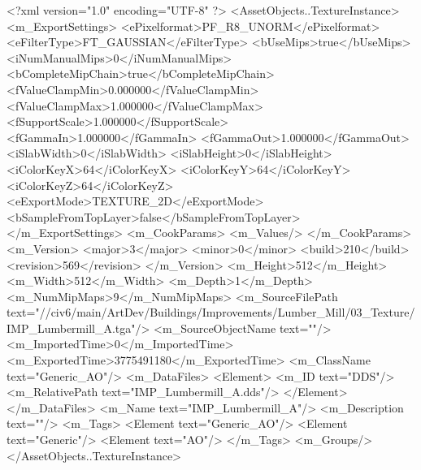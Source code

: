 <?xml version="1.0" encoding="UTF-8" ?>
<AssetObjects..TextureInstance>
	<m_ExportSettings>
		<ePixelformat>PF_R8_UNORM</ePixelformat>
		<eFilterType>FT_GAUSSIAN</eFilterType>
		<bUseMips>true</bUseMips>
		<iNumManualMips>0</iNumManualMips>
		<bCompleteMipChain>true</bCompleteMipChain>
		<fValueClampMin>0.000000</fValueClampMin>
		<fValueClampMax>1.000000</fValueClampMax>
		<fSupportScale>1.000000</fSupportScale>
		<fGammaIn>1.000000</fGammaIn>
		<fGammaOut>1.000000</fGammaOut>
		<iSlabWidth>0</iSlabWidth>
		<iSlabHeight>0</iSlabHeight>
		<iColorKeyX>64</iColorKeyX>
		<iColorKeyY>64</iColorKeyY>
		<iColorKeyZ>64</iColorKeyZ>
		<eExportMode>TEXTURE_2D</eExportMode>
		<bSampleFromTopLayer>false</bSampleFromTopLayer>
	</m_ExportSettings>
	<m_CookParams>
		<m_Values/>
	</m_CookParams>
	<m_Version>
		<major>3</major>
		<minor>0</minor>
		<build>210</build>
		<revision>569</revision>
	</m_Version>
	<m_Height>512</m_Height>
	<m_Width>512</m_Width>
	<m_Depth>1</m_Depth>
	<m_NumMipMaps>9</m_NumMipMaps>
	<m_SourceFilePath text="//civ6/main/ArtDev/Buildings/Improvements/Lumber_Mill/03_Texture/IMP_Lumbermill_A.tga"/>
	<m_SourceObjectName text=""/>
	<m_ImportedTime>0</m_ImportedTime>
	<m_ExportedTime>3775491180</m_ExportedTime>
	<m_ClassName text="Generic_AO"/>
	<m_DataFiles>
		<Element>
			<m_ID text="DDS"/>
			<m_RelativePath text="IMP_Lumbermill_A.dds"/>
		</Element>
	</m_DataFiles>
	<m_Name text="IMP_Lumbermill_A"/>
	<m_Description text=""/>
	<m_Tags>
		<Element text="Generic_AO"/>
		<Element text="Generic"/>
		<Element text="AO"/>
	</m_Tags>
	<m_Groups/>
</AssetObjects..TextureInstance>

